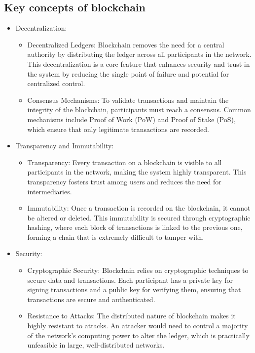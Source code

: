 \subsection{Key concepts of blockchain}
\begin{itemize}
    \item Decentralization:
        \begin{itemize}
            \item Decentralized Ledgers: Blockchain removes the need for a central authority by distributing the ledger across all participants in the network. This decentralization is a core feature that enhances security and trust in the system by reducing the single point of failure and potential for centralized control.
            \item Consensus Mechanisms: To validate transactions and maintain the integrity of the blockchain, participants must reach a consensus. Common mechanisms include Proof of Work (PoW) and Proof of Stake (PoS), which ensure that only legitimate transactions are recorded.
        \end{itemize}
    \item Transparency and Immutability:
        \begin{itemize}
            \item Transparency: Every transaction on a blockchain is visible to all participants in the network, making the system highly transparent. This transparency fosters trust among users and reduces the need for intermediaries.
            \item Immutability: Once a transaction is recorded on the blockchain, it cannot be altered or deleted. This immutability is secured through cryptographic hashing, where each block of transactions is linked to the previous one, forming a chain that is extremely difficult to tamper with.
        \end{itemize}
    \item Security:
        \begin{itemize}
            \item Cryptographic Security: Blockchain relies on cryptographic techniques to secure data and transactions. Each participant has a private key for signing transactions and a public key for verifying them, ensuring that transactions are secure and authenticated.
            \item Resistance to Attacks: The distributed nature of blockchain makes it highly resistant to attacks. An attacker would need to control a majority of the network's computing power to alter the ledger, which is practically unfeasible in large, well-distributed networks.

\end{itemize}
\end{itemize}
